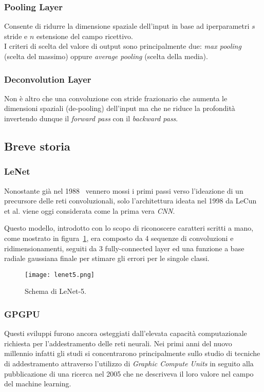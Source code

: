 \subsubsection{Pooling Layer}
Consente di ridurre la dimensione spaziale dell'input in base ad iperparametri $s$ stride e $n$ estensione del campo ricettivo.\\
I criteri di scelta del valore di output sono principalmente due: \textit{max pooling} (scelta del massimo) oppure \textit{average pooling} (scelta della media).\par

\subsubsection{Deconvolution Layer}
Non è altro che una convoluzione con stride frazionario che aumenta le dimensioni spaziali (de-pooling) dell'input ma che ne riduce la profondità invertendo dunque il \textit{forward pass} con il \textit{backward pass}.


\subsection{Breve storia}

\subsubsection{LeNet}

Nonostante già nel 1988~\cite{zhang1990parallel} vennero mossi i primi passi verso l'ideazione di un precursore delle reti convoluzionali, solo l'architettura ideata nel 1998 da LeCun et al.\cite{LeNet} viene oggi considerata come la prima vera \textit{CNN}.\par
Questo modello, introdotto con lo scopo di riconoscere caratteri scritti a mano, come mostrato in figura~\ref{fig:lenet5}, era composto da 4 sequenze di convoluzioni e ridimensionamenti, seguiti da 3 fully-connected layer ed una funzione a base radiale gaussiana finale per stimare gli errori per le singole classi.\par

\begin{figure}[H]
	\centering
	\texttt{[image: lenet5.png]}
	\caption{Schema di LeNet-5.}
\label{fig:lenet5}
\end{figure}

\subsubsection{GPGPU}
Questi sviluppi furono ancora osteggiati dall'elevata capacità computazionale richiesta per l'addestramento delle reti neurali. Nei primi anni del nuovo millennio infatti gli studi si concentrarono principalmente sullo studio di tecniche di addestramento attraverso l'utilizzo di \textit{Graphic Compute Units} in seguito alla pubblicazione di una ricerca nel 2005 che ne descriveva il loro valore nel campo del machine learning.\cite{gpuml}

